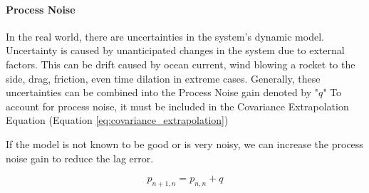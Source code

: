         
        \paragraph*{Process Noise} In the real world, there are uncertainties in the system's dynamic model.
        Uncertainty is caused by unanticipated changes in the system due to external factors.
        This can be drift caused by ocean current, wind blowing a rocket to the side, drag, friction, even time dilation in extreme cases.
        Generally, these uncertainties can be combined into the Process Noise gain denoted by "$q$"
        To account for process noise, it must be included in the Covariance Extrapolation Equation (Equation \ref{eq:covariance_extrapolation})

        If the model is not known to be good or is very noisy, we can increase the process noise gain to reduce the lag error.

        \begin{equation}
            p_{n+1,n} = p_{n,n} + q
        \end{equation}
